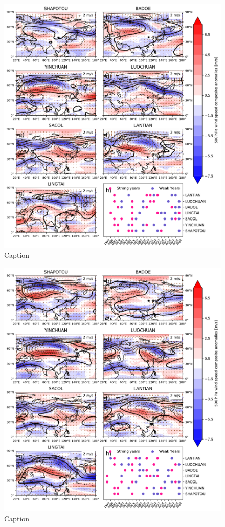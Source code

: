 \begin{figure}[hptb]
    \centering
    \includegraphics[width=\columnwidth]{texfiles/figs/20micrion_DJF_ws_geopot_500hPa.pdf}
    \caption{Caption}
    \label{fig:DJF_500hPa_coarse_composite}
\end{figure}

\begin{figure}[hptb]
    \centering
    \includegraphics[width=\columnwidth]{texfiles/figs/2micrion_DJF_ws_geopot_500hPa.pdf}
    \caption{Caption}
    \label{fig:DJF_500hPa_fine_composite}
\end{figure}